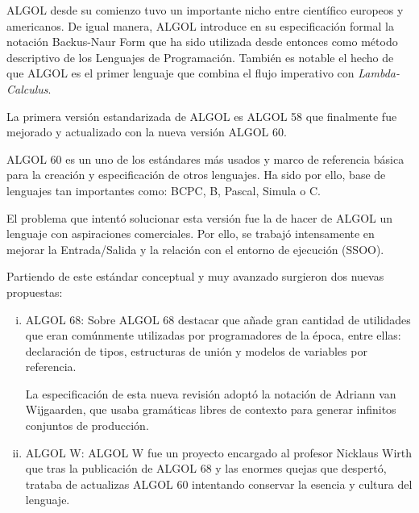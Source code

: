 ALGOL desde su comienzo tuvo un importante nicho entre científico europeos y
americanos. De igual manera, ALGOL introduce en su especificación formal la
notación Backus-Naur Form que ha sido
utilizada desde entonces como método descriptivo de los Lenguajes de
Programación. También es notable el hecho de que ALGOL es el primer lenguaje
que combina el flujo imperativo con \textit{Lambda-Calculus}.

La primera versión estandarizada de ALGOL es ALGOL 58 que finalmente fue
mejorado y actualizado con la nueva versión ALGOL 60.


ALGOL 60 es un uno de los estándares más usados y marco de referencia básica
para la creación y especificación de otros lenguajes. Ha sido por ello, base de lenguajes tan
importantes como: BCPC, B, Pascal, Simula o C.

El problema que intentó solucionar esta versión fue la de hacer de ALGOL un
lenguaje con aspiraciones comerciales. Por ello, se trabajó intensamente en
mejorar la Entrada/Salida y la relación con el entorno de ejecución (SSOO).

Partiendo de este estándar conceptual y muy avanzado surgieron dos nuevas
propuestas:

\begin{enumerate}[i.]

\item ALGOL 68: Sobre ALGOL 68 destacar que añade gran
cantidad de utilidades que eran comúnmente utilizadas por programadores de la época, entre
ellas: declaración de tipos, estructuras de unión y modelos de variables por
referencia.

La especificación de esta nueva revisión adoptó la notación de Adriann van Wijgaarden, que usaba gramáticas libres de contexto para generar infinitos conjuntos de producción.

\item ALGOL W: ALGOL W fue un proyecto encargado al profesor Nicklaus Wirth que tras la publicación de ALGOL 68 y las enormes quejas que despertó, trataba de actualizas ALGOL 60 intentando conservar la esencia y cultura del
lenguaje. 

\end{enumerate}





